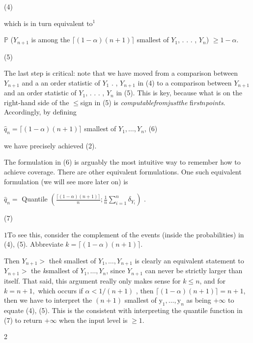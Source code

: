 \documentclass[a4paper,12pt]{article}
\begin{document}
(4)

which is in turn equivalent $\mathrm{to}^{1}$

$\mathbb{P}$ ($Y_{n+1}$ is among the $\lceil(1-\alpha)(n+1)\rceil$ smallest of $Y_{1}$, . . . , $Y_{n}$) $\geq 1-\alpha.$

(5)

The last step is critical: note that we have moved from a comparison between $Y_{n+1}$ and a an order statistic of $Y_{1}$ . , $Y_{n+1}$ in (4) to a comparison between $Y_{n+1}$ and an order statistic of $Y_{1}$, . . . , $Y_{n}$ in (5). This is key, because what is on the right-hand side of the $\leq$sign in (5) is {\it computable}{\it from}{\it just}{\it the} fi{\it rst}$n${\it points}. Accordingly, by defining

$\hat{q}_{n}=\lceil(1-\alpha)(n+1)\rceil$ smallest of $Y_{1}, \ldots, Y_{n}$,   (6)

we have precisely achieved (2).

The formulation in (6) is arguably the most intuitive way to remember how to achieve coverage. There are other equivalent formulations. One such equivalent formulation (we will see more later on) is

$\hat{q}_{n}=$ Quantile $(\displaystyle \frac{\lceil(1-\alpha)(n+1)\rceil}{n};\frac{1}{n}\sum_{i=1}^{n}\delta_{Y_{i}})$ .

(7)

$1\mathrm{To}$ see this, consider the complement of the events (inside the probabilities) in (4), (5). Abbreviate $k=\lceil(1-\alpha)(n+1)\rceil.$

Then $Y_{n+1}>$ the{\it k} smallest of $Y_{1}, \ldots, Y_{n+1}$ is clearly an equivalent statement to $Y_{n+1}>$ the {\it k}smallest of $Y_{1}, \ldots, Y_{n}$, since $Y_{n+1}$ can never be strictly larger than itself. That said, this argument really only makes sense for $k\leq n$, and for $k=n+1,$ which occurs if $\alpha < 1/(n+1)$ , then $\lceil(1-\alpha)(n+1)\rceil=n+1$, then we have to interpret the $(n+1)$ smallest of $\mathrm{y}_{1}, \ldots, \mathrm{y}_{n}$ as being $+\infty$ to equate (4), (5). This is the consistent with interpreting the quantile function in (7) to return $+\infty$ when the input level is $\geq 1.$

2
\end{document}
